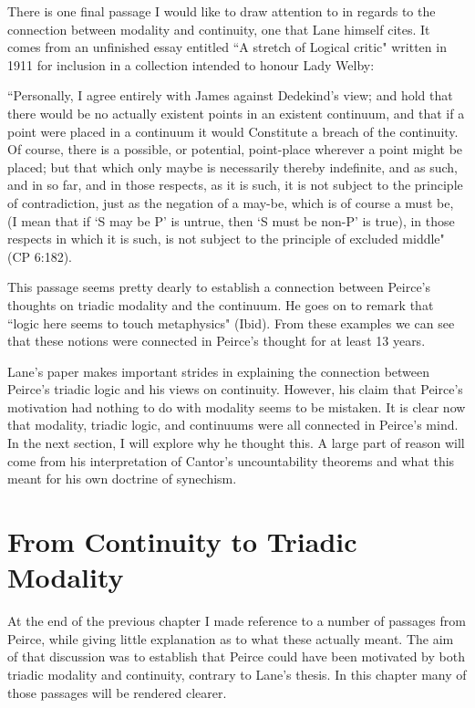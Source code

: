 \documentclass[12pt]{article}
\begin{document}
There is one final passage I would like to draw attention to in regards to the connection between modality and continuity, one that Lane himself cites. It comes from an unfinished essay entitled ``A stretch of Logical critic" written in 1911 for inclusion in a collection intended to honour Lady Welby: 
\begin{singlespace}
``Personally, I agree entirely with James against Dedekind's view; and hold that there would be no actually existent points in an existent continuum, and that if a point were placed in a continuum it would Constitute a breach of the continuity. Of course, there is a possible, or potential, point-place wherever a point might be placed; but that which only maybe is necessarily thereby indefinite, and as such, and in so far, and in those respects, as it is such, it is not subject to the principle of contradiction, just as the negation of a may-be, which is of course a must be, (I mean that if `S may be P’ is untrue, then `S must be non-P’ is true), in those respects in which it is such, is not subject to the principle of excluded middle" (CP 6:182).
\end{singlespace}
\noindent This passage seems pretty dearly to establish a connection between Peirce's thoughts on triadic modality and the continuum. He goes on to remark that ``logic here seems to touch metaphysics" (Ibid). From these examples we can see that these notions were connected in Peirce's thought for at least 13 years.
 
Lane's paper makes important strides in explaining the connection between Peirce's triadic logic and his views on continuity. However, his claim that Peirce's motivation had nothing to do with modality seems to be mistaken. It is clear now that modality, triadic logic, and continuums were all connected in Peirce's mind. In the next section, I will explore why he thought this. A large part of reason will come from his interpretation of Cantor's uncountability theorems and what this meant for his own doctrine of synechism.

\section{From Continuity to Triadic Modality}

At the end of the previous chapter I made reference to a number of passages from Peirce, while giving little explanation as to what these actually meant. The aim of that discussion was to establish that Peirce could have been motivated by both triadic modality and continuity, contrary to Lane's thesis. In this chapter many of those passages will be rendered clearer. 
\end{document}
